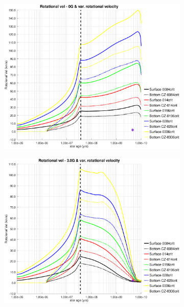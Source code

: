 \documentclass[fleqn,usenatbib]{mnras}
\begin{document}
\begin{figure}
    \centering
    \begin{subfigure}[h]{0.47\textwidth}
    \includegraphics[trim = 30mm 15mm 20mm 15mm, clip,width=\textwidth]{figures/rot_vel_var_vel_0_0g.eps}
    \label{fig:subim41}
    \end{subfigure}
    \begin{subfigure}[h]{0.47\textwidth}
    \includegraphics[trim = 30mm 15mm 20mm 15mm, clip,width=\textwidth]{figures/rot_vel_var_vel_3_0g.eps}
    \label{fig:subim42}
    \end{subfigure}

\end{figure}
\end{document}
